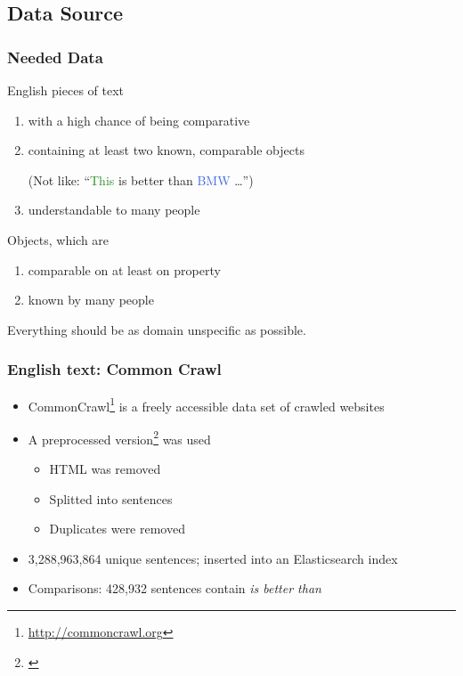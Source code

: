 \documentclass[11pt,aspectratio=169,usenames,dvipsnames]{beamer}
\begin{document}
    \subsection{Data Source}
    \frame{\subsectionpage}

    \begin{frame}[t]
        \frametitle{Needed Data}
        English pieces of text
        \begin{enumerate}
            \item with a high chance of being comparative
            \item containing at least two known, comparable objects\\
            \begin{scriptsize}
                (Not like: \enquote{\textcolor{ForestGreen}{This} is better than \textcolor{RoyalBlue}{BMW} \ldots})
            \end{scriptsize}
            \item understandable to many people
        \end{enumerate}\pause

        Objects, which are
        \begin{enumerate}
            \item comparable on at least on property
            \item known by many people
        \end{enumerate}\pause
        Everything should be as domain unspecific as possible.
    \end{frame}

    \begin{frame}[t]
        \frametitle{English text: Common Crawl}
        \begin{itemize}
            \item CommonCrawl\footnote{\url{http://commoncrawl.org}} is a freely accessible data set of crawled websites
            \item A preprocessed version\footnote{\cite{Panchenko:2017aa}} was used
            \begin{itemize}
                \item HTML was removed
                \item Splitted into sentences
                \item Duplicates were removed
            \end{itemize}\pause
            \item 3,288,963,864 unique sentences; inserted into an Elasticsearch index
            \item Comparisons: 428,932 sentences contain \emph{is better than}
        \end{itemize}

    \end{frame}
\end{document}
